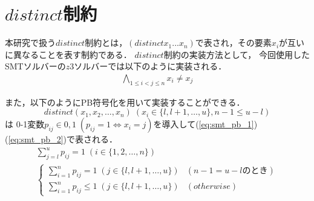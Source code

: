 \section{$distinct$制約}


本研究で扱う$distinct$制約とは，$(distinct x_1 ... x_n)$で表され，その要素$x_i$が互いに異なることを表す制約である．
$distinct$制約の実装方法として，
今回使用したSMTソルバーの$z3ソルバー$では以下のように実装される．
\begin{eqnarray*}
    \bigwedge_{1 \leq i < j \leq n} x_i \neq x_j
\end{eqnarray*}

また，以下のようにPB符号化を用いて実装することができる．
$$distinct(x_1, x_2,\ldots, x_n) \; (x_i \in \{l,l+1,\ldots,u\}, n-1 \leq u-l)$$
は
0-1変数$p_{ij} \in {0,1} \; (p_{ij}=1 \Leftrightarrow x_i=j)$を導入して(\ref{eq:smt_pb_1})(\ref{eq:smt_pb_2})で表される．
\begin{eqnarray}
    \sum_{j=l}^{u} p_{ij}=1 \; (i \in \{1,2,\ldots,n\}) \label{eq:smt_pb_1}\\
    \begin{cases}
        \sum_{i=1}^{n} p_{ij} = 1 \; (j \in \{l,l+1,\ldots,u\}) & (n-1=u-lのとき) \\
        \sum_{i=1}^{n} p_{ij} \leq 1 \; (j \in \{l,l+1,\ldots,u\}) & (otherwise)
    \end{cases}\label{eq:smt_pb_2}
\end{eqnarray}

